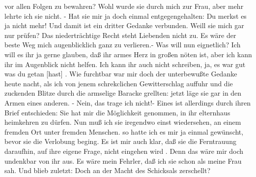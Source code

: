 \def\day{{\color{red} [16. Mai 1944, fortgesetzt] }}
\mktitle

vor allen Folgen zu bewahren?
Wohl wurde sie durch mich zur Frau, aber mehr lehrte ich sie nicht.
- Hat sie mir ja doch einmal entgegengehalten: Du merkst es ja nicht mehr!
Und damit ist  ein dritter Gedanke verbunden.
Weill sie mich gar nur pr\"{u}fen?
Das niedertr\"{a}chtige Recht steht Liebenden nicht zu.
Es w\"{a}re der beste Weg mich augenblicklich ganz zu verlieren.-
Was will nun eignetlich?
Ich will es ihr ja gerne glauben, da{\ss} ihr armes Herz in gro{\ss}en n\"{o}ten ist, aber ich kann ihr im Augenblick nicht helfen.
Ich kann ihr auch nicht schreiben, ja, es war gut was du getan {\color{red} [hast] }.
Wie furchtbar war mir doch der unterbewu{\ss}te Gedanke heute nacht, als ich von jenem schrekclichen Gewitterschlag auffuhr und die zuckenden Blitze durch die armselige Baracke grellten: jetzt l\"{a}ge sie gar in den Armen eines anderen.
- Nein, das trage ich nicht!-
Eines ist allerdings durch ihren Brief entschieden: Sie hat mir die M\"{o}glichkeit genommen, in ihr elternhaus heimkehren zu d\"{u}rfen.
Nun mu{\ss} ich sie iregendwo einst wiedersehen, an einem fremden Ort unter fremden Menschen.
so hatte ich es mir ja einmal gew\"{u}nscht, bevor sie die Verlobung beging.
Es ist mir auch klar, da{\ss} sie die Ferntrauung daraufhin, auf ihre eigene Frage, nicht eingehen wird
.
Denn das w\"{a}re mir doch undenkbar von ihr aus.
Es w\"{a}re mein Fehrler, da{\ss} ich  sie schon als meine Frau sah.
Und blieb zuletzt: Doch an der Macht des Schicksals zerschellt?

\clearpage

